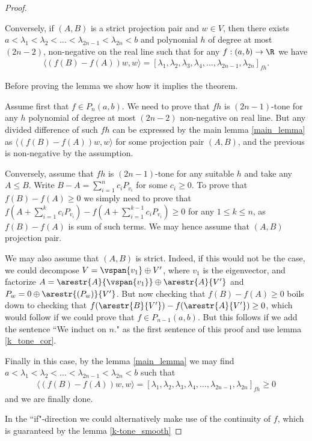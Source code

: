 \begin{proof}
\begin{lem}
		Conversely, if $(A, B)$ is a strict projection pair and $w \in V$, then there exists $a < \lambda_{1} < \lambda_{2} < \ldots < \lambda_{2 n - 1} < \lambda_{2 n} < b$ and polynomial $h$ of degree at most $(2 n - 2)$, non-negative on the real line such that for any $f : (a, b) \to \R$ we have
		\begin{align*}
			\langle (f(B) - f(A)) w, w \rangle = [\lambda_{1}, \lambda_{2}, \lambda_{3}, \lambda_{4}, \ldots, \lambda_{2n - 1}, \lambda_{2 n}]_{f h}.
		\end{align*}
	\end{lem}

	Before proving the lemma we show how it implies the theorem.

	Assume first that $f \in P_{n}(a, b)$. We need to prove that $f h$ is $(2 n - 1)$-tone for any $h$ polynomial of degree at most $(2 n - 2)$ non-negative on real line. But any divided difference of such $f h$ can be expressed by the main lemma \ref{main_lemma} as $\langle (f(B) - f(A)) w, w \rangle$ for some projection pair $(A, B)$, and the previous is non-negative by the assumption.

	Conversely, assume that $f h$ is $(2 n - 1)$-tone for any suitable $h$ and take any $A \leq B$. Write $B - A = \sum_{i = 1}^{n} c_{i} P_{v_{i}}$ for some $c_{i} \geq 0$. To prove that $f(B) - f(A) \geq 0$ we simply need to prove that $f(A + \sum_{i = 1}^{k} c_{i} P_{v_{i}}) - f(A + \sum_{i = 1}^{k - 1} c_{i} P_{v_{i}}) \geq 0$ for any $1 \leq k \leq n$, as $f(B) - f(A)$ is sum of such terms. We may hence assume that $(A, B)$ projection pair.

	We may also assume that $(A, B)$ is strict. Indeed, if this would not be the case, we could decompose $V = \vspan\{v_{1}\} \oplus V'$, where $v_{1}$ is the eigenvector, and factorize $A = \arestr{A}{\vspan\{v_{1}\}} \oplus \arestr{A}{V'}$ and $P_{w} = 0 \oplus \arestr{(P_{w})}{V'}$. But now checking that $f(B) - f(A) \geq 0$ boils down to checking that $f(\arestr{B}{V'}) - f(\arestr{A}{V'}) \geq 0$, which would follow if we could prove that $f \in P_{n - 1}(a, b)$. But this follows if we add the sentence ``We induct on $n$." as the first sentence of this proof and use lemma \ref{k_tone_cor}.

	Finally in this case, by the lemma \ref{main_lemma} we may find $a < \lambda_{1} < \lambda_{2} < \ldots < \lambda_{2 n - 1} < \lambda_{2 n} < b$ such that
	\begin{align*}
		\langle (f(B) - f(A)) w, w \rangle = [\lambda_{1}, \lambda_{2}, \lambda_{3}, \lambda_{4}, \ldots, \lambda_{2n - 1}, \lambda_{2 n}]_{f h} \geq 0
	\end{align*}
	and we are finally done.

	In the ``if"-direction we could alternatively make use of the continuity of $f$, which is guaranteed by the lemma \ref{k-tone_smooth}

\end{proof}


